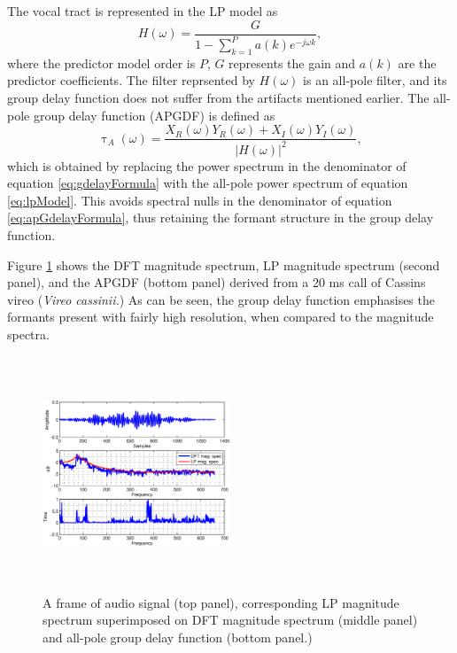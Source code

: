 \documentclass[a4paper]{article}
\begin{document}
The vocal tract is represented in the LP model as
\begin{equation}
H(\omega) = \frac{G}{1-\sum_{k=1}^{P} a(k) e^{-j \omega k}},
\label{eq:lpModel}
\end{equation}
where the predictor model order is $P$, $G$ represents the gain and $a(k)$ are
the predictor coefficients\cite{makhoul}.
The filter reprsented by $H(\omega)$ is an all-pole filter, and its group delay
function does not suffer from the artifacts mentioned earlier. The all-pole 
group delay function (APGDF) is defined as
\begin{equation}
\uptau_A(\omega) = \frac{X_R(\omega) Y_R(\omega) + X_I(\omega)
Y_I(\omega)}{|H(\omega)|^2},
\label{eq:apGdelayFormula}
\end{equation}
which is obtained by replacing the power spectrum in the denominator of equation
\ref{eq:gdelayFormula} with the all-pole power spectrum of equation
\ref{eq:lpModel}. This avoids spectral nulls in the denominator of equation
\ref{eq:apGdelayFormula}, thus retaining the formant structure in the group
delay function.

Figure \ref{fig:all-pole} shows the DFT magnitude spectrum, LP magnitude
spectrum (second panel), and the APGDF (bottom panel) derived from a 20 ms call 
of Cassins vireo (\textit{Vireo cassinii.}) As can be seen, the group delay
function emphasises the formants present with fairly high resolution, when
compared to the magnitude spectra.

\begin{figure}[h]
\includegraphics[width=0.5\textwidth,height=7cm]
{apgd.eps}
\caption{ A frame of audio signal (top panel), corresponding LP
magnitude spectrum superimposed on DFT magnitude spectrum (middle panel) and
all-pole group delay function (bottom panel.)  }
\label{fig:all-pole}
\end{figure}
\end{document}
